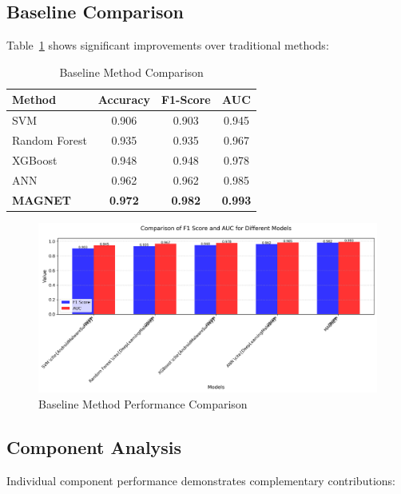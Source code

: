 \documentclass[a4paper,11pt]{article}
\begin{document}
\subsection{Baseline Comparison}
Table~\ref{tab:baseline_comparison} shows significant improvements over traditional methods:

\begin{table}[!htb]
  \centering
  \caption{Baseline Method Comparison}
  \label{tab:baseline_comparison}
  \begin{tabular}{@{}lccc@{}}
    \toprule
    \textbf{Method} & \textbf{Accuracy} & \textbf{F1-Score} & \textbf{AUC} \\
    \midrule
    SVM & 0.906 & 0.903 & 0.945 \\
    Random Forest & 0.935 & 0.935 & 0.967 \\
    XGBoost & 0.948 & 0.948 & 0.978 \\
    ANN & 0.962 & 0.962 & 0.985 \\
    \midrule
    \textbf{MAGNET} & \textbf{0.972} & \textbf{0.982} & \textbf{0.993} \\
    \bottomrule
  \end{tabular}
\end{table}

\begin{figure}[!htb]
  \centering
  \includegraphics[width=0.9\linewidth]{../fig_baseline_comparison.png}
  \caption{Baseline Method Performance Comparison}
  \label{fig:baseline_comparison}
\end{figure}

\subsection{Component Analysis}
Individual component performance demonstrates complementary contributions:
\end{document}
